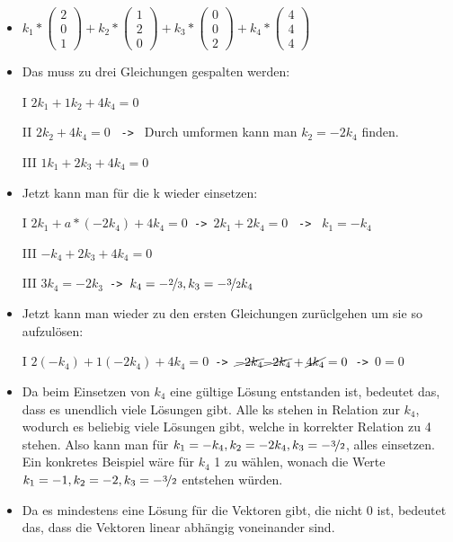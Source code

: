 \documentclass{article}
\begin{document}
\begin{itemize}
\begin{itemize}
\begin{itemize}
				\item{$k_1*\begin{pmatrix} 2 \\ 0 \\ 1 \end{pmatrix}+k_2*\begin{pmatrix} 1 \\ 2 \\ 0 \end{pmatrix}+k_3*\begin{pmatrix} 0 \\ 0 \\ 2 \end{pmatrix}+k_4*\begin{pmatrix} 4 \\ 4 \\ 4 \end{pmatrix}$}
				\item{Das muss zu drei Gleichungen gespalten werden:}
				\item[I]{$2k_1+1k_2+4k_4=0$}
				\item[II]{$2k_2+4k_4=0$ \texttt{ -> } Durch umformen kann man $k_2=-2k_4$ finden.}
				\item[III]{$1k_1+2k_3+4k_4=0$}
				\item{Jetzt kann man für die k wieder einsetzen:}
				\item[I]{$2k_1+a*(-2k_4)+4k_4=0$\texttt{ -> }$2k_1+2k_4=0$ \texttt{ -> } $k_1=-k_4$}
				\item[III]{$-k_4+2k_3+4k_4=0$}
				\item[III]{$3k_4=-2k_3$\texttt{ -> }$k_4=-\nicefrac{2}{3}, k_3=-\nicefrac{3}{2}k_4$}
				\item{Jetzt kann man wieder zu den ersten Gleichungen zurüclgehen um sie so aufzulösen:}
				\item[I]{$2(-k_4)+1(-2k_4)+4k_4=0$\texttt{ -> }$\cancel{-2k_4}\cancel{-2k_4}+\cancel{4k_4}=0$\texttt{ -> }$0=0$}
				\item{Da beim Einsetzen von $k_4$ eine gültige Lösung entstanden ist, bedeutet das, dass es unendlich viele Lösungen gibt. Alle ks stehen in Relation zur $k_4$, wodurch es beliebig viele Lösungen gibt, welche in korrekter Relation zu 4 stehen. Also kann man für $k_1=-k_4,k_2=-2k_4,k_3=-\nicefrac{3}{2}$, alles einsetzen. Ein konkretes Beispiel wäre für $k_4$ 1 zu wählen, wonach die Werte $k_1=-1,k_2=-2,k_3=-\nicefrac{3}{2}$ entstehen würden.}
				\item{Da es mindestens eine Lösung für die Vektoren gibt, die nicht 0 ist, bedeutet das, dass die Vektoren linear abhängig voneinander sind.}

\end{itemize}
\end{itemize}
\end{itemize}
\end{document}
